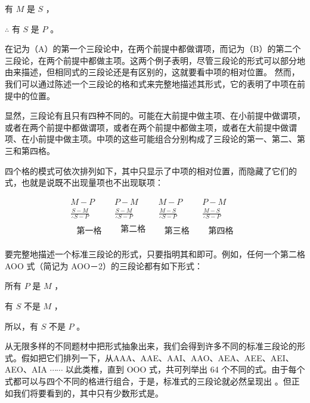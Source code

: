 有 $M$ 是 $S$ ，

$\therefore$ 有 $S$ 是 $P$ 。

在记为（A）的第一个三段论中，在两个前提中都做谓项，而记为（B）的第二个三段论，在两个前提中都做主项。这两个例子表明，尽管三段论的形式可以部分地由来描述，但相同式的三段论还是有区别的，这就要看中项的相对位置。\cite{lukasiewicz1957} 然而，我们可以通过陈述一个三段论的格和式来完整地描述其形式，它的表明了中项在前提中的位置。

\begin{theorembox}[title=三段论的四格]
显然，三段论有且只有四种不同的。可能在大前提中做主项、在小前提中做谓项，或者在两个前提中都做谓项，或者在两个前提中都做主项，或者在大前提中做谓项、在小前提中做主项。中项的这些可能组合分别构成了三段论的第一、第二、第三和第四格。
\end{theorembox}

四个格的模式可依次排列如下，其中只显示了中项的相对位置，而隐藏了它们的式，也就是说既不出现量项也不出现联项：

$$
\begin{array}{llll}
M-P & P-M & M-P & P-M \\
\frac{S-M}{\therefore S-P} & \frac{S-M}{\therefore S-P} & \frac{M-S}{\therefore S-P} & \frac{M-S}{\therefore S-P} \\
\begin{array}{l}
\text { 第一格 }
\end{array} & \begin{array}{l}
\text { 第二格 } \\
\end{array} & \begin{array}{l}
\text { 第三格 }
\end{array} & \begin{array}{l}
\text { 第四格 }
\end{array}
\end{array}
$$

要完整地描述一个标准三段论的形式，只要指明其和即可。例如，任何一个第二格 AOO 式（简记为 AOO－2）的三段论都有如下形式：

所有 $P$ 是 $M$ ，

有 $S$ 不是 $M$ ，

所以，有 $S$ 不是 $P$ 。

从无限多样的不同题材中把形式抽象出来，我们会得到许多不同的标准三段论的形式。假如把它们排列一下，从AAA、AAE、AAI、AAO、AEA、AEE、AEI、AEO、AIA $\cdots \cdots$ 以此类椎，直到 OOO 式，共可列举出 64 个不同的式。由于每个式都可以与四个不同的格进行组合，于是，标准式的三段论就必然呈现出 。但正如我们将要看到的，其中只有少数形式是。

